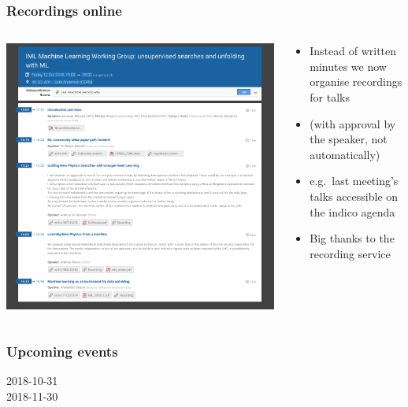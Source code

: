 \begin{frame}
  \frametitle{Recordings online}
  \begin{columns}
    \begin{column}{.6\textwidth}
      \includegraphics[width=.95\textwidth]{./rec.png}
    \end{column}
    \begin{column}{.4\textwidth}
      \begin{itemize}
        \item Instead of written minutes we now organise recordings for talks
        \item (with approval by the speaker, not automatically)
        \item e.g.\ last meeting's talks accessible on the indico agenda
        \item {\Large{Big thanks to the recording service}}
      \end{itemize}
    \end{column}
  \end{columns}
\end{frame}

\begin{frame}
  \frametitle{Upcoming events}
  \begin{description}
    \item[2018-10-31] 
    \item[2018-11-30] 
  \end{description}
\end{frame}

